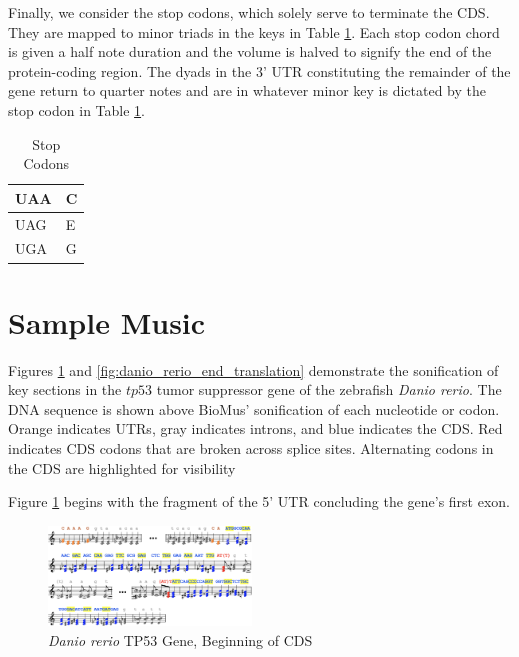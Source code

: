 \documentclass[letterpaper]{article}
\begin{document}
Finally, we consider the stop codons, which solely serve to terminate the CDS. They are mapped to minor triads in the keys in Table  \ref{table:stop_codons}. Each stop codon chord is given a half note duration and the volume is halved to signify the end of the protein-coding region. The dyads in the 3’ UTR constituting the remainder of the gene return to quarter notes and are in whatever minor key is dictated by the stop codon in Table  \ref{table:stop_codons}.

\begin{table}[h!]
\centering
\begin{tabular}{|l|l|}
\hline
UAA & C \\ \hline
UAG & E \\ \hline
UGA & G \\ \hline
\end{tabular}
\caption{Stop Codons}
\label{table:stop_codons}
\vspace{-5mm}
\end{table}

\section{Sample Music}

Figures \ref{fig:danio_rerio_start_translation} and \ref{fig:danio_rerio_end_translation} demonstrate the sonification of key sections in the $tp53$ tumor suppressor gene of the zebrafish \textit{Danio rerio}. The DNA sequence is shown above BioMus’ sonification of each nucleotide or codon. Orange indicates UTRs, gray indicates introns, and blue indicates the CDS. Red indicates CDS codons that are broken across splice sites. Alternating codons in the CDS are highlighted for visibility

Figure \ref{fig:danio_rerio_start_translation} begins with the fragment of the 5' UTR concluding the gene's first exon. 

\begin{figure}[h!]
\centering
\vspace{-2mm}
\includegraphics[width=0.48\textwidth]{images/danio_rerio_start_translation}
  \caption{\textit{Danio rerio} TP53 Gene, Beginning of CDS}
  \label{fig:danio_rerio_start_translation}
  \vspace{-3mm}
\end{figure}
\end{document}
